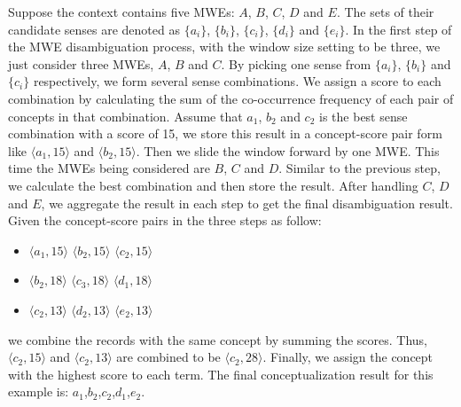 Suppose the context contains five MWEs: $A$, $B$, $C$, $D$ and $E$. The sets of their candidate senses
are denoted as $\{a_i\}$, $\{b_i\}$, $\{c_i\}$, $\{d_i\}$ and $\{e_i\}$.
In the first step of the MWE disambiguation process, with the window size setting to be three,
we just consider three MWEs, $A$, $B$ and $C$.
By picking one sense from $\{a_i\}$, $\{b_i\}$ and $\{c_i\}$ respectively,
we form several sense combinations. We assign a score to each combination by calculating the sum of
the co-occurrence frequency of each pair of concepts in that combination. Assume that
$a_1$, $b_2$ and $c_2$ is the best sense combination with a score of 15,
we store this result in a concept-score pair form like
$\langle a_1,15\rangle$ and $\langle b_2,15\rangle$. Then we slide the window forward
by one MWE.  This time the MWEs being considered are $B$, $C$ and $D$.
Similar to the previous step, we calculate
the best combination and then store the result. After handling $C$, $D$ and $E$,
we aggregate the result in each step to get the final disambiguation result.
Given the concept-score pairs in the three steps as follow:

\begin{itemize}
\item {$\langle a_1,15\rangle$ $\langle b_2,15\rangle$ $\langle c_2,15\rangle$}
\item {$\langle b_2,18\rangle$ $\langle c_3,18\rangle$ $\langle d_1,18\rangle$}
\item {$\langle c_2,13\rangle$ $\langle d_2,13\rangle$ $\langle e_2,13\rangle$}
\end{itemize}


we combine the records with the same concept by summing the scores.
Thus, $\langle c_2,15\rangle$ and $\langle c_2,13\rangle$
are combined to be $\langle c_2,28\rangle$.
Finally, we assign the concept with the highest score to each term.
The final conceptualization result for this example is: $a_1$,$b_2$,$c_2$,$d_1$,$e_2$.


